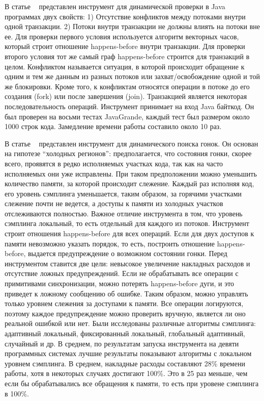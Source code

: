 В статье ~\cite{Sadowski:2009} представлен инструмент для динамической проверки в Java программах двух свойств:
1) Отсутствие конфликтов между потоками внутри одной транзакции.
2) Потоки внутри транзакции не должны влиять на потоки вне ее. 
Для проверки первого условия используется алгоритм векторных часов, который строит отношение happens-before внутри транзакции. Для проверки второго условия тот же самый граф happens-before строится для транзакций в целом. 
Конфликтом называется ситуация, в которой происходит обращение к одним и тем же данным из разных потоков или захват/освобождение одной и той же блокировки. Кроме того, к конфликтам относятся операции в потоке до его создания (fork) или после завершения (join). Транзакцией является некоторая последовательность операций. 
Инструмент принимает на вход Java байткод. Он был проверен на восьми тестах JavaGrande, каждый тест был размером около 1000 строк кода. Замедление времени работы составило около 10 раз. 

В статье ~\cite{Marino:2009:PLDI, Marino:2009} представлен инструмент для динамического поиска гонок. Он основан на гипотезе “холодных регионов”: предполагается, что состояния гонки, скорее всего, проявятся в редко исполняемых участках кода, так как на часто исполняемых они уже исправлены. При таком предположении можно уменьшить количество памяти, за которой происходит слежение. Каждый раз исполняя код, его уровень сэмплинга уменьшается, таким образом, за горячими участками слежение почти не ведется, а доступы к памяти из холодных участков отслеживаются полностью. Важное отличие инструмента в том, что уровень сэмплинга локальный, то есть отдельный для каждого из потоков.
Инструмент строит отношения happens-before для всех операций. Если для двух доступов к памяти невозможно указать порядок, то есть, построить отношение happens-before, выдается предупреждение о возможном состоянии гонки. 
Перед инструментом ставится две цели: невысокое увеличение накладных расходов и отсутствие ложных предупреждений. Если не обрабатывать все операции с примитивами синхронизации, можно потерять happens-before дуги, и это приведет к ложному сообщению об ошибке. Таким образом, можно управлять только уровнем слежения за доступами к памяти. Все операции логируются, поэтому каждое предупреждение можно проверить вручную, является ли оно реальной ошибкой или нет.
Были исследованы различные алгоритмы сэмплинга: адаптивный локальный, фиксированный локальный, глобальный адаптивный, случайный и др. В среднем, по результатам запуска инструмента на девяти программных системах лучшие результаты показывают алгоритмы с локальном уровнем сэмплинга. В среднем, накладные расходы составляют 28\% времени работы, хотя в некоторых случаях достигают 100\%. Это в 25 раз меньше, чем если бы обрабатывались все обращения к памяти, то есть при уровене сэмплинга в 100\%.

